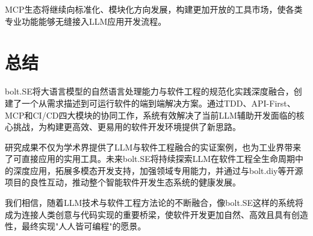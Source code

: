 MCP生态将继续向标准化、模块化方向发展，构建更加开放的工具市场，使各类专业功能能够无缝接入LLM应用开发流程。

\section{总结}

bolt.SE将大语言模型的自然语言处理能力与软件工程的规范化实践深度融合，创建了一个从需求描述到可运行软件的端到端解决方案。通过TDD、API-First、MCP和CI/CD四大模块的协同工作，系统有效解决了当前LLM辅助开发面临的核心挑战，为构建更高效、更易用的软件开发环境提供了新思路。

研究成果不仅为学术界提供了LLM与软件工程融合的实证案例，也为工业界带来了可直接应用的实用工具。未来bolt.SE将持续探索LLM在软件工程全生命周期中的深度应用，拓展多模态开发支持，加强领域专用能力，并通过与bolt.diy等开源项目的良性互动，推动整个智能软件开发生态系统的健康发展。

我们相信，随着LLM技术与软件工程方法论的不断融合，像bolt.SE这样的系统将成为连接人类创意与代码实现的重要桥梁，使软件开发更加自然、高效且具有创造性，最终实现"人人皆可编程"的愿景。 